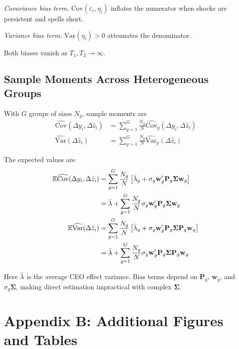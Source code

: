 \documentclass[sigconf,nonacm]{acmart}
\newcommand{\Var}{\text{Var}}
\newcommand{\Cov}{\text{Cov}}
\begin{document}
\textit{Covariance bias term.} $\Cov(\varepsilon_i,\eta_i)$ inflates the numerator when shocks are persistent and spells short.

\textit{Variance bias term.} $\Var(\eta_i)>0$ attenuates the denominator.

Both biases vanish as $T_1,T_2\to\infty$. 

\subsection{Sample Moments Across Heterogeneous Groups}

With $G$ groups of sizes $N_g$, sample moments are
\begin{align}
\widehat{\Cov}(\Delta y_i,\Delta \hat z_i) &= \sum_{g=1}^G \frac{N_g}{N} \widehat{\Cov}_g(\Delta y_i,\Delta \hat z_i)\\
\widehat{\Var}(\Delta \hat z_i) &= \sum_{g=1}^G \frac{N_g}{N} \widehat{\Var}_g(\Delta \hat z_i)
\end{align}

The expected values are
\begin{align}
\mathbb E\widehat{\Cov}(\Delta y_i,\Delta \hat z_i)
&= \sum_{g=1}^G \frac{N_g}{N} \left[
\Bar\lambda_g
+ \sigma_g \mathbf w_g' \mathbf P_g\mathbf\Sigma \mathbf w_g\right]\nonumber\\
&= \Bar\lambda +\sum_{g=1}^G \frac{N_g}{N}
\sigma_g \mathbf w_g' \mathbf P_g\mathbf\Sigma \mathbf w_g\\
\mathbb E\widehat{\Var}(\Delta \hat z_i)
&= \sum_{g=1}^G \frac{N_g}{N} \left[
\Bar\lambda_g
+ \sigma_g \mathbf w_g' \mathbf P_g\mathbf\Sigma \mathbf P_g \mathbf w_g\right]\nonumber\\
&= \Bar\lambda +\sum_{g=1}^G \frac{N_g}{N}
\sigma_g \mathbf w_g' \mathbf P_g\mathbf\Sigma \mathbf P_g \mathbf w_g
\end{align}

Here $\Bar\lambda$ is the average CEO effect variance. Bias terms depend on $\mathbf P_g$, $\mathbf w_g$, and $\sigma_g\mathbf\Sigma$, making direct estimation impractical with complex $\mathbf\Sigma$.

\clearpage

\section*{Appendix B: Additional Figures and Tables}
\end{document}
